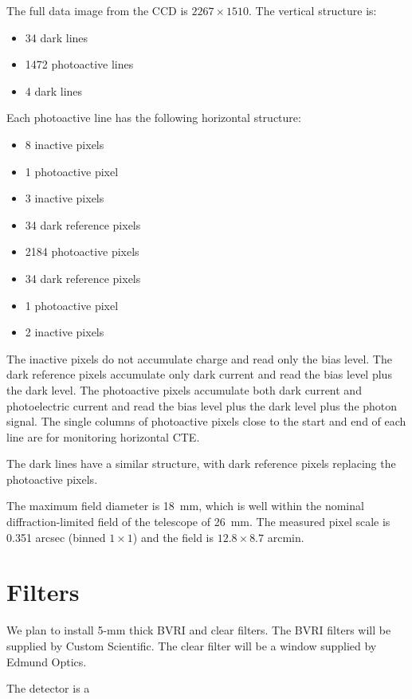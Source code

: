 The full data image from the CCD is $2267 \times 1510$. The vertical structure is:

\begin{itemize}
\item 34 dark lines
\item 1472 photoactive lines
\item 4 dark lines
\end{itemize}

Each photoactive line has the following horizontal structure:

\begin{itemize}
\item 8 inactive pixels
\item 1 photoactive pixel
\item 3 inactive pixels
\item 34 dark reference pixels
\item 2184 photoactive pixels
\item 34 dark reference pixels
\item 1 photoactive pixel
\item 2 inactive pixels
\end{itemize}

The inactive pixels do not accumulate charge and read only the bias level. The dark reference pixels accumulate only dark current and read the bias level plus the dark level. The photoactive pixels accumulate both dark current and photoelectric current and read the bias level plus the dark level plus the photon signal. The single columns of photoactive pixels close to the start and end of each line are for monitoring horizontal CTE.

The dark lines have a similar structure, with dark reference pixels replacing the photoactive pixels.

The maximum field diameter is 18~mm, which is well within the nominal diffraction-limited field of the telescope of 26~mm. The measured pixel scale is 0.351 arcsec (binned $1\times1$) and the field is $12.8 \times 8.7$ arcmin.

\section{Filters}

We plan to install 5-mm thick BVRI and clear filters. The BVRI filters will be supplied by Custom Scientific. The clear filter will be a window supplied by Edmund Optics.

The detector is a  

